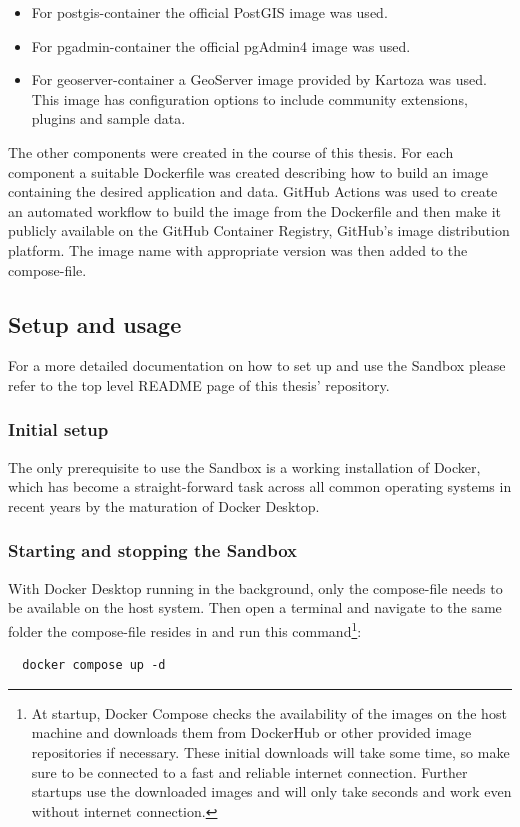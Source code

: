 \documentclass[11pt, a4paper, oneside, parskip=full-]{scrartcl}
\begin{document}
\begin{itemize}
  \item For postgis-container the official PostGIS image was
  used\cite{postgis-container}.
  \item For pgadmin-container the official pgAdmin4 image was
  used\cite{pgadmin-container}.
  \item For geoserver-container a GeoServer image provided by Kartoza was
  used\cite{geoserver-container}. This image has configuration options to
  include community extensions, plugins and sample data.
\end{itemize}

The other components were created in the course of this thesis. For each
component a suitable Dockerfile was created describing how to build an image
containing the desired application and data. GitHub Actions\cite{githubactions}
was used to create an automated workflow to build the image from the Dockerfile
and then make it publicly available on the GitHub Container Registry\cite{gcr},
GitHub's image distribution platform. The image name with appropriate version
was then added to the compose-file.

\subsection{Setup and usage}
For a more detailed documentation on how to set up and use the Sandbox please
refer to the top level README page of this thesis'
repository\cite{osgeostacksandbox}.

\subsubsection*{Initial setup}
The only prerequisite to use the Sandbox is a working installation of Docker,
which has become a straight-forward task across all common operating systems in
recent years by the maturation of Docker Desktop\cite{dockerdesktop}.

\subsubsection*{Starting and stopping the Sandbox}
With Docker Desktop running in the background, only the
compose-file\cite{sandboxcomposefile} needs to be available on the host system.
Then open a terminal and navigate to the same folder the compose-file resides in
and run this command\footnote{At startup, Docker Compose checks the availability
of the images on the host machine and downloads them from DockerHub or other
provided image repositories if necessary. These initial downloads will take some
time, so make sure to be connected to a fast and reliable internet connection.
Further startups use the downloaded images and will only take seconds and work
even without internet connection.}:
\begin{lstlisting}
  docker compose up -d
\end{lstlisting}
\end{document}
